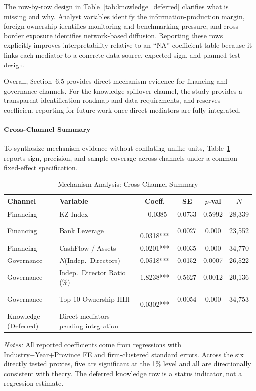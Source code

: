 The row-by-row design in Table~\ref{tab:knowledge_deferred} clarifies what is missing and why. Analyst variables identify the information-production margin, foreign ownership identifies monitoring and benchmarking pressure, and cross-border exposure identifies network-based diffusion. Reporting these rows explicitly improves interpretability relative to an ``NA'' coefficient table because it links each mediator to a concrete data source, expected sign, and planned test design.

Overall, Section~6.5 provides direct mechanism evidence for financing and governance channels. For the knowledge-spillover channel, the study provides a transparent identification roadmap and data requirements, and reserves coefficient reporting for future work once direct mediators are fully integrated.

\paragraph{Cross-Channel Summary}

To synthesize mechanism evidence without conflating unlike units, Table~\ref{tab:cross_channel} reports sign, precision, and sample coverage across channels under a common fixed-effect specification.

\begin{table}[htbp]
\centering
\caption{Mechanism Analysis: Cross-Channel Summary}
\label{tab:cross_channel}
\small
\begin{tabular}{llcccc}
\toprule
\textbf{Channel} & \textbf{Variable} & \textbf{Coeff.} & \textbf{SE} & \textbf{$p$-val} & \textbf{$N$} \\
\midrule
Financing & KZ Index & $-$0.0385 & 0.0733 & 0.5992 & 28,339 \\
Financing & Bank Leverage & $-$0.0318*** & 0.0027 & 0.000 & 23,552 \\
Financing & CashFlow / Assets & 0.0201*** & 0.0035 & 0.000 & 34,770 \\
Governance & $N$(Indep.\ Directors) & 0.0518*** & 0.0152 & 0.0007 & 26,522 \\
Governance & Indep.\ Director Ratio (\%) & 1.8238*** & 0.5627 & 0.0012 & 20,136 \\
Governance & Top-10 Ownership HHI & $-$0.0302*** & 0.0054 & 0.000 & 34,753 \\
Knowledge (Deferred) & Direct mediators pending integration & -- & -- & -- & -- \\
\bottomrule
\end{tabular}
\begin{tablenotes}
\small
\item \textit{Notes:} All reported coefficients come from regressions with Industry+Year+Province FE and firm-clustered standard errors. Across the six directly tested proxies, five are significant at the 1\% level and all are directionally consistent with theory. The deferred knowledge row is a status indicator, not a regression estimate.
\end{tablenotes}
\end{table}


